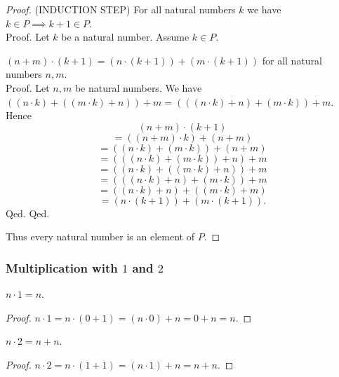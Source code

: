 \documentclass[../../arithmetic.tex]{subfiles}
\begin{document}
\begin{forthel}
\begin{proof}
      (INDUCTION STEP) For all natural numbers $k$ we have $k \in P \implies k + 1 \in P$. \\
      Proof.
        Let $k$ be a natural number.
        Assume $k \in P$.

        $(n + m) \cdot (k + 1) = (n \cdot (k + 1)) + (m \cdot (k + 1))$ for all
        natural numbers $n,m$. \\
        Proof.
          Let $n,m$ be natural numbers.
          We have $((n \cdot k) + ((m \cdot k) + n)) + m =
          (((n \cdot k) + n) + (m \cdot k)) + m$.
          Hence
          \[ (n + m) \cdot (k + 1) \]
          \[ = ((n + m) \cdot k) + (n + m) \]
          \[ = ((n \cdot k) + (m \cdot k)) + (n + m) \]
          \[ = (((n \cdot k) + (m \cdot k)) + n) + m \]
          \[ = ((n \cdot k) + ((m \cdot k) + n)) + m \]
          \[ = (((n \cdot k) + n) + (m \cdot k)) + m \]
          \[ = ((n \cdot k) + n) + ((m \cdot k) + m) \]
          \[ = (n \cdot (k + 1)) + (m \cdot (k + 1)). \]
        Qed.
      Qed.

      Thus every natural number is an element of $P$.
    \end{proof}
  \end{forthel}


  \subsubsection*{Multiplication with $1$ and $2$}

  \begin{forthel}
    \begin{proposition}\label{Arithmetic_01_03_866630}
      $n \cdot 1 = n$.
    \end{proposition}
    \begin{proof}
      $ n \cdot 1
      = n \cdot (0 + 1)   %
      = (n \cdot 0) + n   %
      = 0 + n             %
      = n$.               %
    \end{proof}


    \begin{corollary}\label{Arithmetic_01_03_302621}
    $n \cdot 2 = n + n$.
    \end{corollary}
    \begin{proof}
      $ n \cdot 2
      = n \cdot (1 + 1)   %
      = (n \cdot 1) + n   %
      = n + n$.           %
    \end{proof}
  \end{forthel}
\end{document}
